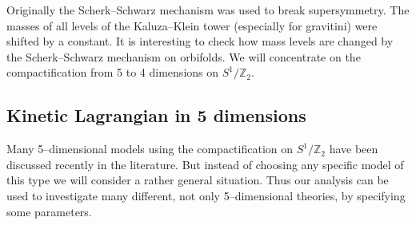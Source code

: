 \documentclass[a4paper,12pt]{article}
\def\ZZ{\mathbb Z}
\begin{document}
Originally the Scherk--Schwarz mechanism
\cite{Scherk:1978ta,Scherk:1979zr} was used to break
supersymmetry. The masses of all levels of the Kaluza--Klein tower 
(especially for gravitini) were
shifted by a constant. It is interesting to check how mass levels are 
changed by the Scherk--Schwarz mechanism on orbifolds. We will
concentrate on the compactification from 5 to 4 dimensions on
$S^1/\ZZ_2$. 




\subsection{Kinetic Lagrangian in 5 dimensions}


Many 5--dimensional models using the compactification on
$S^1/\ZZ_2$  have been discussed recently in the literature.
But instead of choosing any specific model of this type we will
consider a rather general situation. Thus our analysis can be used
to investigate many different, not only 5--dimensional theories, by
specifying some parameters.
\end{document}
